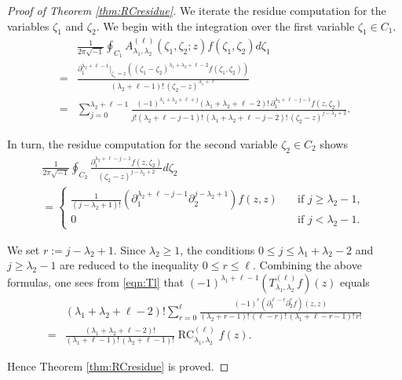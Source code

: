 \documentclass[10pt,a4paper]{amsart}
\newcommand{\RC}{\operatorname{RC}}
\begin{document}
\begin{proof}
[Proof of Theorem \ref{thm:RCresidue}]
We iterate the residue computation for the variables $\zeta_1$ and $\zeta_2$.  
We begin with the integration
 over the first variable $\zeta_1 \in C_1$.  
\begin{align*}
  &\frac {1}{2 \pi \sqrt{-1}}
  \oint_{C_1} 
  A_{\lambda_1, \lambda_2}^{(\ell)}(\zeta_1, \zeta_2;z)f(\zeta_1, \zeta_2) d \zeta_1
\\
=& \frac{\partial_1^{\lambda_2+\ell-1}|_{\zeta_1=z}((\zeta_1-\zeta_2)^{\lambda_1+\lambda_2+\ell-2} f(\zeta_1, \zeta_2))}
  {(\lambda_2+\ell-1)!\, (\zeta_2-z)^{\lambda_1+\ell}}
\\
=& \sum_{j=0}^{\lambda_2+\ell-1}
   \frac{(-1)^{\lambda_1+\lambda_2+\ell+j} (\lambda_1+\lambda_2+\ell-2)!\, \partial_1^{\lambda_2+\ell-j-1}f(z, \zeta_2)}
        {j ! (\lambda_2 + \ell -j -1)!\, (\lambda_1+\lambda_2+\ell-j-2)!\, 
(\zeta_2-z)^{j-\lambda_2+2}}.  
\end{align*}



In turn, 
 the residue computation for the second variable $\zeta_2 \in C_2$ shows
\begin{multline*}
  \frac {1}{2 \pi \sqrt{-1}}
  \oint_{C_2} 
  \frac{\partial_1^{\lambda_2+\ell-j-1}f(z, \zeta_2)}
  {(\zeta_2-z)^{j-\lambda_2+2}}d \zeta_2
\\
=
  \begin{cases}
  \frac{1}{(j-\lambda_2+1)!}
  (\partial_1^{\lambda_2+\ell-j-1} \partial_2^{j-\lambda_2+1})f(z,z)
  \quad&\text{if $j \ge \lambda_2-1$, }
\\
  0\quad&\text{if $j < \lambda_2-1$}.  
\end{cases}
\end{multline*}



We set $r:=j-\lambda_2+1$.  
Since $\lambda_2 \ge 1$, 
 the conditions $0 \le j \le \lambda_1 + \lambda_2-2$
 and $j \ge \lambda_2-1$ are reduced to the inequality
 $0 \le r \le \ell$.  
Combining the above formulas, 
 one sees from \eqref{eqn:Tl}
 that $(-1)^{\lambda_1+\ell-1} (T_{\lambda_1,\lambda_2}^{(\ell)} f)(z)$ equals 
\begin{align*}
  &(\lambda_1+\lambda_2+\ell-2)!
   \sum_{r=0}^\ell
   \frac{(-1)^r  (\partial_1^{\ell-r} \partial_2^r f) (z,z)}
  {(\lambda_2+r-1)!\, (\ell-r)!\, (\lambda_1+\ell-r-1)!\, r!}
\\
  =&
  \frac{(\lambda_1+\lambda_2+\ell-2)!}
       {(\lambda_1+\ell-1)!\, (\lambda_2+\ell-1)!}
  \RC_{\lambda_1, \lambda_2}^{(\ell)}f(z).  
\end{align*}

Hence Theorem \ref{thm:RCresidue} is proved.  
\end{proof}
\end{document}
